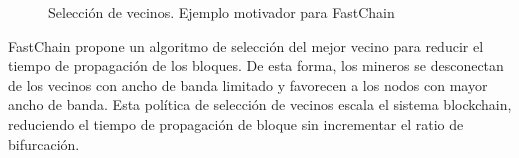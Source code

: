 \begin{figure}
  \centering
  \hspace{1.5cm}
  \caption{Selección de vecinos. Ejemplo motivador para FastChain}
  \label{fig:fastchain}
\end{figure}

%
FastChain propone un algoritmo de selección del mejor vecino para reducir el tiempo de propagación de los bloques.
%
De esta forma, los mineros se desconectan de los vecinos con ancho de banda limitado y
favorecen a los nodos con mayor ancho de banda.
%
Esta política de selección de vecinos escala el sistema blockchain,
reduciendo el tiempo de propagación de bloque sin incrementar el ratio de bifurcación.
%



